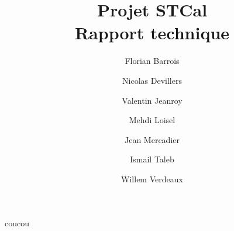 \documentclass[a4paper,10pt]{report}
\date{}
\title{\Huge{Projet STCal}\\ {\Large Rapport technique}}
\author{Florian Barrois \and Nicolas Devillers \and Valentin Jeanroy \and Mehdi Loisel \and Jean Mercadier \and Ismail Taleb \and Willem Verdeaux}
\begin{document}
coucou
\end{document}
